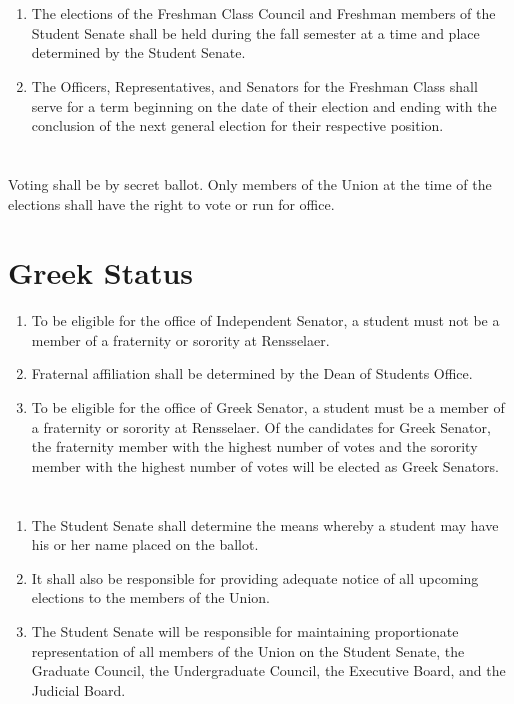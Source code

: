 \documentclass[12pt]{constitution}
\begin{document}
\section{}
\begin{enumerate}
\item The elections of the Freshman Class Council and Freshman members of the Student Senate shall
be held during the fall semester at a time and place determined by the Student Senate.
\item The Officers, Representatives, and Senators for the Freshman Class shall serve for a term
beginning on the date of their election and ending with the conclusion of the next general
election for their respective position.
\end{enumerate}

\section{}
Voting shall be by secret ballot. Only members of the Union at the time of the elections shall have the right to vote or run for office.

\section{Greek Status}
\begin{enumerate}
\item To be eligible for the office of Independent Senator, a student must not be a member of a
fraternity or sorority at Rensselaer.
\item Fraternal affiliation shall be determined by the Dean of Students Office.
\item To be eligible for the office of Greek Senator, a student must be a member of a fraternity or
sorority at Rensselaer. Of the candidates for Greek Senator, the fraternity member with the
highest number of votes and the sorority member with the highest number of votes will be
elected as Greek Senators.
\end{enumerate}

\section{}
\begin{enumerate}
\item The Student Senate shall determine the means whereby a student may have his or her name
placed on the ballot.
\item It shall also be responsible for providing adequate notice of all upcoming elections to the
members of the Union.
\item The Student Senate will be responsible for maintaining proportionate representation of all
members of the Union on the Student Senate, the Graduate Council, the Undergraduate
Council, the Executive Board, and the Judicial Board.
\end{enumerate}
\end{document}
